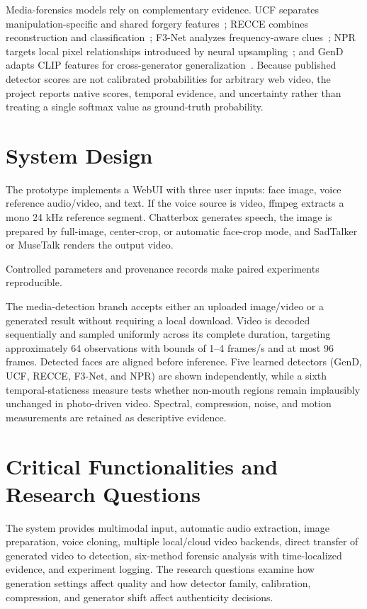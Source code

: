 \documentclass[10pt,conference]{IEEEtran}
\begin{document}
Media-forensics models rely on complementary evidence. UCF separates manipulation-specific and shared forgery features~\cite{ucf}; RECCE combines reconstruction and classification~\cite{recce}; F3-Net analyzes frequency-aware clues~\cite{f3net}; NPR targets local pixel relationships introduced by neural upsampling~\cite{npr}; and GenD adapts CLIP features for cross-generator generalization~\cite{gend}. Because published detector scores are not calibrated probabilities for arbitrary web video, the project reports native scores, temporal evidence, and uncertainty rather than treating a single softmax value as ground-truth probability.

\section{System Design}
The prototype implements a WebUI with three user inputs: face image, voice reference audio/video, and text. If the voice source is video, ffmpeg extracts a mono 24 kHz reference segment. Chatterbox generates speech, the image is prepared by full-image, center-crop, or automatic face-crop mode, and SadTalker or MuseTalk renders the output video.

Controlled parameters and provenance records make paired experiments reproducible.

The media-detection branch accepts either an uploaded image/video or a generated result without requiring a local download. Video is decoded sequentially and sampled uniformly across its complete duration, targeting approximately 64 observations with bounds of 1--4 frames/s and at most 96 frames. Detected faces are aligned before inference. Five learned detectors (GenD, UCF, RECCE, F3-Net, and NPR) are shown independently, while a sixth temporal-staticness measure tests whether non-mouth regions remain implausibly unchanged in photo-driven video. Spectral, compression, noise, and motion measurements are retained as descriptive evidence.

\section{Critical Functionalities and Research Questions}
The system provides multimodal input, automatic audio extraction, image preparation, voice cloning, multiple local/cloud video backends, direct transfer of generated video to detection, six-method forensic analysis with time-localized evidence, and experiment logging. The research questions examine how generation settings affect quality and how detector family, calibration, compression, and generator shift affect authenticity decisions.
\end{document}
